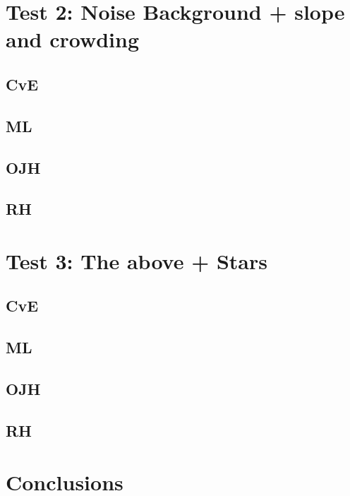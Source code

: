 \documentclass[10pt, a4paper]{article}
\begin{document}
\section{Test 2: Noise Background + slope and crowding}
\subsection{CvE}
\subsection{ML}
\subsection{OJH}
\subsection{RH}

\section{Test 3: The above + Stars}
\subsection{CvE}
\subsection{ML}
\subsection{OJH}
\subsection{RH}


\section{Conclusions}
\end{document}
